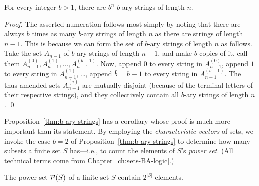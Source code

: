 \begin{prop}
\label{thm:b-ary strings}
For every integer $b > 1$, there are $b^n$ $b$-ary strings of length $n$.
\end{prop}

\begin{proof}
The asserted numeration follows most simply by noting that there are always $b$ times as many $b$-ary strings of length $n$ as there are strings of length $n-1$.  This is because we can form the set of $b$-ary strings of length $n$ as follows.  Take the set $A_{n-1}$ of $b$-ary strings of length $n-1$, and make $b$ copies of it, call them $A^{(0)}_{n-1}, A^{(1)}_{n-1}, \ldots, A^{(b-1)}_{n-1}$.  Now, append $0$ to every string in $A^{(0)}_{n-1}$, append $1$ to every string in
$A^{(1)}_{n-1}$, \ldots, append $\bar{b} = b-1$ to every string in $A^{(b-1)}_{n-1}$.  The thus-amended sets $A^{(i)}_{n-1}$ are mutually disjoint (because of the terminal letters of their respective strings), and they collectively contain all $b$-ary strings of length $n$.  \qed
\end{proof}

\medskip

 

Proposition~\ref{thm:b-ary strings} has a corollary whose proof is much more important than its
statement.   By employing the {\em characteristic vectors} of sets, we invoke the case $b=2$ of 
Proposition~\ref{thm:b-ary strings} to determine how many subsets a finite set $S$ has---i.e., to
count the elements of $S$'s {\em power set}.  (All technical terms come from Chapter~\ref{ch:sets-BA-logic}.)

\begin{prop}
\label{thm:power-sets}
The power set $\mbox{$\cal P$}(S)$ of a finite set $S$ contain $2^{|S|}$ elements.
\end{prop}


